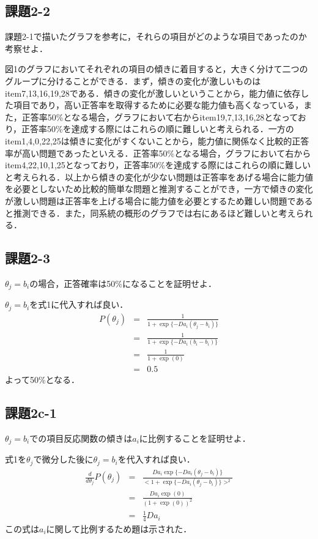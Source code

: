 \documentclass[12pt]{jarticle}
\begin{document}
\subsection{課題2-2}
\begin{shadebox}
    \quad 課題2-1で描いたグラフを参考に，それらの項目がどのような項目であったのか考察せよ．
\end{shadebox}
\vspace{\baselineskip}
図1のグラフにおいてそれぞれの項目の傾きに着目すると，大きく分けて二つのグループに分けることができる．まず，傾きの変化が激しいものはitem7,13,16,19,28である．傾きの変化が激しいということから，能力値に依存した項目であり，高い正答率を取得するために必要な能力値も高くなっている，また，正答率50\%となる場合，グラフにおいて右からitem19,7,13,16,28となっており，正答率50\%を達成する際にはこれらの順に難しいと考えられる．一方のitem1,4,0,22,25は傾きに変化がすくないことから，能力値に関係なく比較的正答率が高い問題であったといえる．正答率50\%となる場合，グラフにおいて右からitem4,22,10,1,25となっており，正答率50\%を達成する際にはこれらの順に難しいと考えられる．以上から傾きの変化が少ない問題は正答率をあげる場合に能力値を必要としないため比較的簡単な問題と推測することができ，一方で傾きの変化が激しい問題は正答率を上げる場合に能力値を必要とするため難しい問題であると推測できる．また，同系統の概形のグラフでは右にあるほど難しいと考えられる．
\subsection{課題2-3}
\begin{shadebox}
    \quad $\theta_j=b_i$の場合，正答確率は50\%になることを証明せよ．
\end{shadebox}
\vspace{\baselineskip}
$\theta_j=b_i$を式1に代入すれば良い．
\begin{eqnarray*}
    P(\theta_j)&=&\frac{1}{1+\exp\{-Da_i(\theta_j -b_i)\}}\\
    &=&\frac{1}{1+\exp\{-Da_i(b_i -b_i)\}}\\
    &=&\frac{1}{1+\exp(0)}\\
    &=&0.5
\end{eqnarray*}
よって50\%となる．

\subsection{課題2c-1}
\begin{shadebox}
    \quad $\theta_j=b_i$での項目反応関数の傾きは$a_i$に比例することを証明せよ．
\end{shadebox}
\vspace{\baselineskip}
式1を$\theta_j$で微分した後に$\theta_j=b_i$を代入すれば良い．
\begin{eqnarray*}
    \frac{d}{d \theta_j}P(\theta_j)&=&\frac{Da_i\exp\{-Da_i(\theta_j -b_i)\}}{<1+\exp\{-Da_i(\theta_j -b_i)\}>^2}\\
    &=&\frac{Da_i\exp(0)}{(1+\exp(0))^2}\\
    &=&\frac{1}{4}Da_i
\end{eqnarray*}
この式は$a_i$に関して比例するため題は示された．
\end{document}
